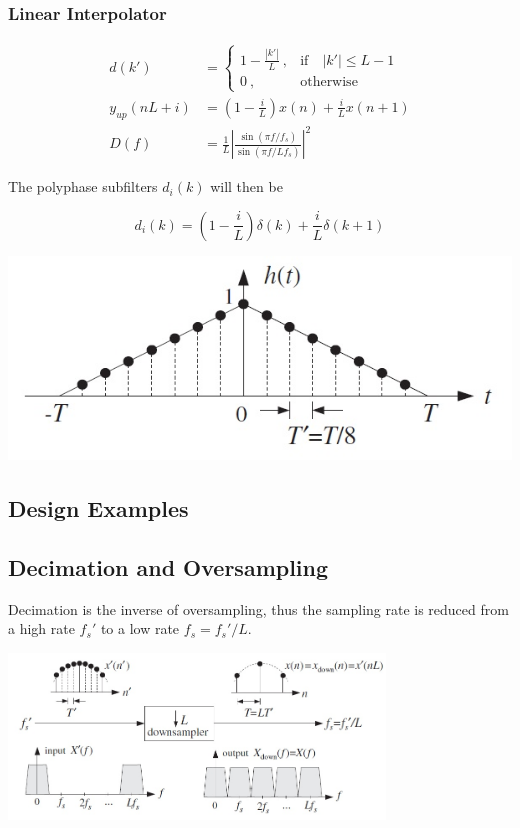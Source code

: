 \subsubsection{Linear Interpolator}
\begin{multicols}{2}
	\begin{align*}
		d(k') &= \begin{cases}
			1-\frac{|k'|}{L}\:, & \text{if} \quad |k'|\leq L -1\\
			0\:, & \text{otherwise}
		\end{cases} \\
		y_{up}(nL+i) &= (1-\frac{i}{L})x(n)+\frac{i}{L}x(n+1) \\
		D(f) &= \frac{1}{L}\left|\frac{\sin(\pi f/f_s)}{\sin(\pi f/Lf_s)}\right|^2
	\end{align*}
	
	The polyphase subfilters $d_i(k)$ will then be
	
	\begin{equation*}
		d_i(k) = (1-\frac{i}{L}) \delta(k) + \frac{i}{L} \delta(k+1)
	\end{equation*}	
\vfill
\columnbreak
	\begin{center}
		\includegraphics[width=0.8\linewidth]{images/IntDecOv_Linear.jpg}
	\end{center}
\vfill
\end{multicols}

		
\subsection{Design Examples}

\subsection{Decimation and Oversampling}
Decimation is the inverse of oversampling, thus the sampling rate is reduced
from a high rate $f_s'$ to a low rate $f_s = f_s' / L$. 

\begin{center}
	\includegraphics[width=10cm]{images/IntDecOv_Downsampler.jpg}
\end{center}

